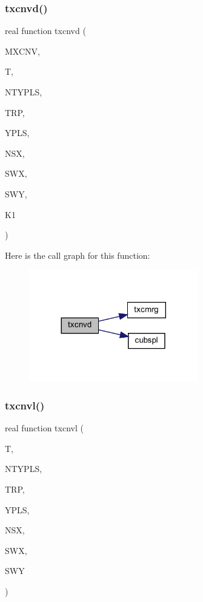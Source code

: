 \subsubsection{\texorpdfstring{txcnvd()}{txcnvd()}}
{\footnotesize\ttfamily real function txcnvd (\begin{DoxyParamCaption}\item[{integer, intent(in)}]{M\+X\+C\+NV,  }\item[{real, intent(in)}]{T,  }\item[{integer, intent(in)}]{N\+T\+Y\+P\+LS,  }\item[{real, dimension(ntypls), intent(in)}]{T\+RP,  }\item[{real, dimension(4,ntypls), intent(in)}]{Y\+P\+LS,  }\item[{integer, intent(in)}]{N\+SX,  }\item[{real, dimension(nsx), intent(in)}]{S\+WX,  }\item[{real, dimension(nsx,3), intent(in)}]{S\+WY,  }\item[{integer}]{K1 }\end{DoxyParamCaption})}

Here is the call graph for this function\+:
\nopagebreak
\begin{figure}[H]
\begin{center}
\leavevmode
\includegraphics[width=209pt]{Marco_8f90_a1cdfcb6ee629073412c28d9cf0215636_cgraph}
\end{center}
\end{figure}
\mbox{\label{Marco_8f90_a1cb0065a1b3068676ef2beb814db93f5}} 
\subsubsection{\texorpdfstring{txcnvl()}{txcnvl()}}
{\footnotesize\ttfamily real function txcnvl (\begin{DoxyParamCaption}\item[{real}]{T,  }\item[{integer}]{N\+T\+Y\+P\+LS,  }\item[{real, dimension(ntypls)}]{T\+RP,  }\item[{real, dimension(4,ntypls)}]{Y\+P\+LS,  }\item[{integer}]{N\+SX,  }\item[{real, dimension(nsx)}]{S\+WX,  }\item[{real, dimension(nsx,3)}]{S\+WY }\end{DoxyParamCaption})}


